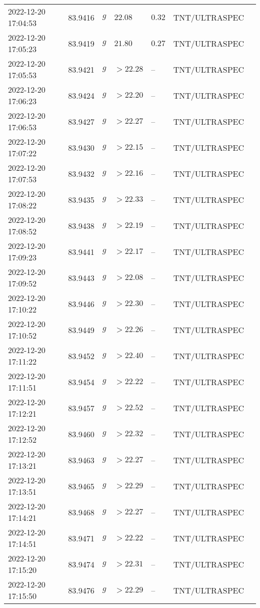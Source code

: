 \documentclass{nature_plusfigure}
\begin{document}
\begin{supplement}
\begin{center}
\begin{longtable}{lllllll}
2022-12-20 17:04:53 & 83.9416 & $g$ & $22.08$ & $0.32$ & TNT/ULTRASPEC &  \\ 
2022-12-20 17:05:23 & 83.9419 & $g$ & $21.80$ & $0.27$ & TNT/ULTRASPEC &  \\ 
2022-12-20 17:05:53 & 83.9421 & $g$ & $>22.28$ & -- & TNT/ULTRASPEC &  \\ 
2022-12-20 17:06:23 & 83.9424 & $g$ & $>22.20$ & -- & TNT/ULTRASPEC &  \\ 
2022-12-20 17:06:53 & 83.9427 & $g$ & $>22.27$ & -- & TNT/ULTRASPEC &  \\ 
2022-12-20 17:07:22 & 83.9430 & $g$ & $>22.15$ & -- & TNT/ULTRASPEC &  \\ 
2022-12-20 17:07:53 & 83.9432 & $g$ & $>22.16$ & -- & TNT/ULTRASPEC &  \\ 
2022-12-20 17:08:22 & 83.9435 & $g$ & $>22.33$ & -- & TNT/ULTRASPEC &  \\ 
2022-12-20 17:08:52 & 83.9438 & $g$ & $>22.19$ & -- & TNT/ULTRASPEC &  \\ 
2022-12-20 17:09:23 & 83.9441 & $g$ & $>22.17$ & -- & TNT/ULTRASPEC &  \\ 
2022-12-20 17:09:52 & 83.9443 & $g$ & $>22.08$ & -- & TNT/ULTRASPEC &  \\ 
2022-12-20 17:10:22 & 83.9446 & $g$ & $>22.30$ & -- & TNT/ULTRASPEC &  \\ 
2022-12-20 17:10:52 & 83.9449 & $g$ & $>22.26$ & -- & TNT/ULTRASPEC &  \\ 
2022-12-20 17:11:22 & 83.9452 & $g$ & $>22.40$ & -- & TNT/ULTRASPEC &  \\ 
2022-12-20 17:11:51 & 83.9454 & $g$ & $>22.22$ & -- & TNT/ULTRASPEC &  \\ 
2022-12-20 17:12:21 & 83.9457 & $g$ & $>22.52$ & -- & TNT/ULTRASPEC &  \\ 
2022-12-20 17:12:52 & 83.9460 & $g$ & $>22.32$ & -- & TNT/ULTRASPEC &  \\ 
2022-12-20 17:13:21 & 83.9463 & $g$ & $>22.27$ & -- & TNT/ULTRASPEC &  \\ 
2022-12-20 17:13:51 & 83.9465 & $g$ & $>22.29$ & -- & TNT/ULTRASPEC &  \\ 
2022-12-20 17:14:21 & 83.9468 & $g$ & $>22.27$ & -- & TNT/ULTRASPEC &  \\ 
2022-12-20 17:14:51 & 83.9471 & $g$ & $>22.22$ & -- & TNT/ULTRASPEC &  \\ 
2022-12-20 17:15:20 & 83.9474 & $g$ & $>22.31$ & -- & TNT/ULTRASPEC &  \\ 
2022-12-20 17:15:50 & 83.9476 & $g$ & $>22.29$ & -- & TNT/ULTRASPEC &  \\ 

\end{longtable}
\end{center}
\end{supplement}
\end{document}
